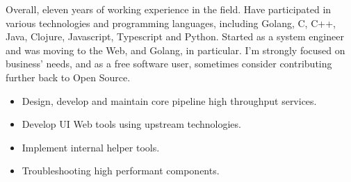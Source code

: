 \documentclass[10pt,a4paper,ragged2e,withhyper]{altacv}
\begin{document}


\makecvheader


Overall, eleven years of working experience in the field. Have participated in
various technologies and programming languages, including Golang, C, C++, Java,
Clojure, Javascript, Typescript and Python. Started as a system engineer and was
moving to the Web, and Golang, in particular. I'm strongly focused on business'
needs, and as a free software user, sometimes consider contributing further back
to Open Source.




     
 

\divider


   
   
  \cvtag{\LaTeX{}}  
  


\begin{itemize}
\item Design, develop and maintain core pipeline high throughput services.
\item Develop UI Web tools using upstream technologies.
\item Implement internal helper tools.
\item Troubleshooting high performant components.
\end{itemize}
\end{document}
